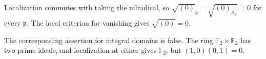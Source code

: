 Localization commutes with taking the nilradical, so $\sqrt{(0)}_{\mathfrak p}=\sqrt{(0)_{A_{\mathfrak p}}}=0$ for every $\mathfrak p$. The local criterion for vanishing gives $\sqrt{(0)}=0$.

The corresponding assertion for integral domains is false. The ring $\mathbb F_2\times\mathbb F_2$ has two prime ideals, and localization at either gives $\mathbb F_2$, but $(1,0)(0,1)=0$.
